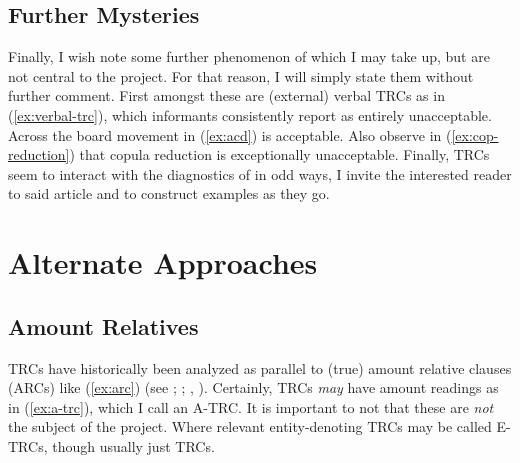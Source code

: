 \documentclass[11pt]{article}
\begin{document}
\begin{exe}
	\label{ex:mixed}
	\label{ex:split}
\end{exe}

\subsection{Further Mysteries}

Finally, I wish note some further phenomenon of which I may take up, but are not central to the project. For that reason, I will simply state them without further comment. First amongst these are (external) verbal TRCs as in (\ref{ex:verbal-trc}), which informants consistently report as entirely unacceptable. Across the board movement in (\ref{ex:acd}) is acceptable. Also observe in (\ref{ex:cop-reduction}) that copula reduction is exceptionally unacceptable. Finally, TRCs seem to interact with the diagnostics of \citet{postalContrastingExtractionTypes1994} in odd ways, I invite the interested reader to said article and to construct examples as they go.

\begin{exe}
	\label{ex:verbal-trc}
	\label{ex:acd}
	\label{ex:cop-reduction}
\end{exe}

\section{Alternate Approaches}

\subsection{Amount Relatives}

TRCs have historically been analyzed as parallel to (true) amount relative clauses (ARCs) like (\ref{ex:arc}) (see \cite{carlsonAmountRelatives1977}; \cite{heimWhereDoesDefiniteness1987}; \cite{grosuStrangeRelativesThird1998}, \citeyear{grosuAmountRelatives2017}). Certainly, TRCs \textit{may} have amount readings as in (\ref{ex:a-trc}), which I call an A-TRC. It is important to not that these are \textit{not} the subject of the project. Where relevant entity-denoting TRCs may be called E-TRCs, though usually just TRCs.
\end{document}
